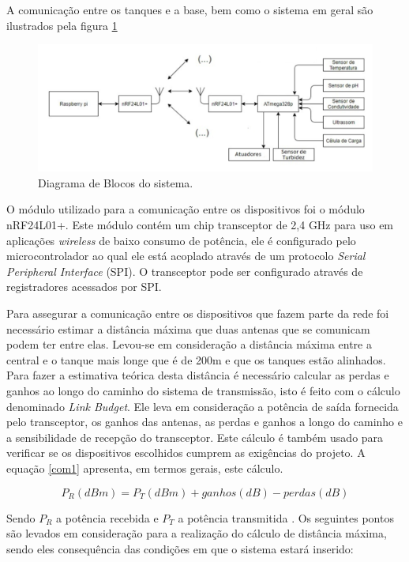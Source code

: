 A comunicação entre os tanques e a base, bem como o sistema em geral são ilustrados pela figura \ref{diagramacomunicacao}

\begin{figure}[!h]
\centering \includegraphics[scale=0.4]{figuras/diagrama_de_comunicacao}
\caption{Diagrama de Blocos do sistema.}
\label{diagramacomunicacao}
 \end{figure}

O módulo utilizado para a comunicação entre os dispositivos foi o módulo nRF24L01+. Este módulo contém um chip transceptor de 2,4 GHz para uso em aplicações \textit{wireless} de baixo consumo de potência, ele é configurado pelo microcontrolador ao qual ele está acoplado através de um protocolo \textit{Serial Peripheral Interface} (SPI). O transceptor pode ser  configurado através de registradores acessados por SPI.

Para assegurar a comunicação entre os dispositivos que fazem parte da rede foi necessário estimar a distância máxima que duas antenas que se comunicam podem ter entre elas. Levou-se em consideração a distância máxima entre a central e o tanque mais longe que é de 200m e que os tanques estão alinhados. Para fazer a estimativa teórica desta distância é necessário calcular as perdas e ganhos ao longo do caminho do sistema de transmissão, isto é feito com o cálculo denominado \textit{Link Budget}. Ele leva em consideração a potência de saída fornecida pelo transceptor, os ganhos das antenas, as perdas e ganhos a longo do caminho e a sensibilidade de recepção do transceptor. Este cálculo é também usado para verificar se os dispositivos escolhidos cumprem as exigências do projeto.  A equação \ref{com1} apresenta, em termos gerais, este cálculo.

\begin{equation}
\label{com1}
	P_{R} (dBm) = P_{T} (dBm) + ganhos (dB) - perdas (dB)
\end{equation}

Sendo $P_{R}$ a potência recebida e $P_{T}$ a potência transmitida \cite{ianpoole}.
Os seguintes pontos são levados em consideração para a realização do cálculo de distância máxima, sendo eles consequência das condições em que o sistema estará inserido:


